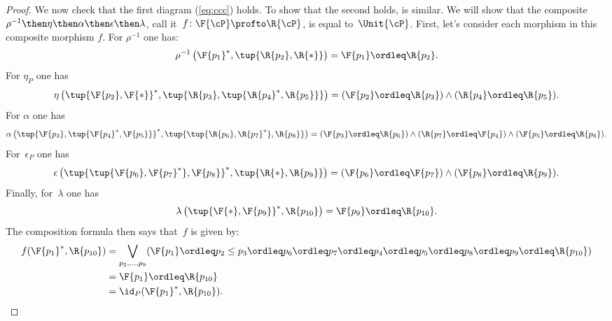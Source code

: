 \begin{proof}
    We now check that the first diagram (\cref{eq:ccc}) holds. To show that the second holds, is similar. We will show that the composite~$\rho^{-1}\then \eta\then \alpha \then \epsilon\then \lambda$, call it~$f\colon \F{\cP} \profto \R{\cP} $, is equal to~$\Unit{\cP }$. First, let's consider each morphism in this composite morphism $f$. For $\rho^{-1}$ one has:
    \begin{equation}
        \rho^{-1}\left(\F{p_1}^*,\tup{\R{p_2},\R{*}}\right)=\F{p_1}\ordleq \R{p_2}.
    \end{equation}
    For $\eta_P$ one has
    \begin{equation}
        \eta\left(\tup{\F{p_2},\F{*}}^*,\tup{\R{p_3},\tup{\R{p_4}^*,\R{p_5}}}\right)=(\F{p_2}\ordleq \R{p_3})\wedge(\R{p_4}\ordleq \R{p_5}).
    \end{equation}
    For $\alpha$ one has
    \begin{equation}
        \alpha\left( \tup{\F{p_3},\tup{\F{p_4}^*,\F{p_5}}}^*,\tup{\tup{\R{p_6},\R{p_7}^*},\R{p_8}}\right)=(\F{p_3}\ordleq \R{p_6})\wedge(\R{p_7}\ordleq \F{p_4})\wedge(\F{p_5}\ordleq \R{p_8}).
    \end{equation}
    For~$\epsilon_P$ one has
    \begin{equation}
        \epsilon\left(\tup{\tup{\F{p_6},\F{p_7}^*},\F{p_8}}^*,\tup{\R{*},\R{p_9}}\right)=(\F{p_6}\ordleq \F{p_7})\wedge (\F{p_8}\ordleq \R{p_9}).
    \end{equation}
    Finally, for~$\lambda$ one has
    \begin{equation}
        \lambda\left(\tup{\F{*},\F{p_9}}^*,\R{p_{10}}\right)=\F{p_9}\ordleq \R{p_{10}}.
    \end{equation}
    The composition formula then says that~$f$ is given by:
    \begin{equation}
        \begin{aligned}
            f(\F{p_1}^*,\R{p_{10}})&=\bigvee_{p_2,\ldots,p_9} (\F{p_1}\ordleq p_2\leq p_3\ordleq p_6\ordleq p_7\ordleq p_4\ordleq p_5\ordleq p_8\ordleq p_9\ordleq \R{p_{10}})\\
            &=\F{p_1}\ordleq \R{p_{10}}\\
            &=\id_P(\F{p_1}^*,\R{p_{10}}).
        \end{aligned}
    \end{equation}
\end{proof}

